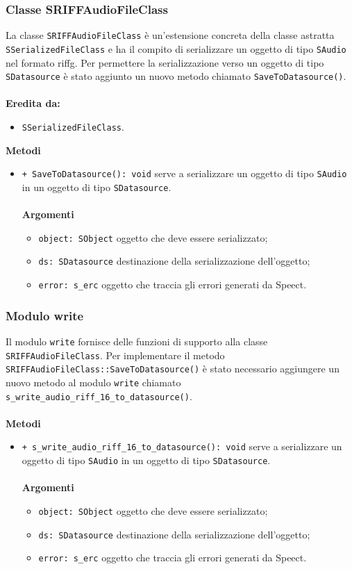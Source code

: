 \subsubsection{Classe SRIFFAudioFileClass}
La classe \texttt{SRIFFAudioFileClass} è un'estensione concreta della classe astratta \texttt{SSerializedFileClass} e ha il compito di serializzare un oggetto di tipo \texttt{SAudio} nel formato \gls{riffg}.
Per permettere la serializzazione verso un oggetto di tipo \texttt{SDatasource} è stato aggiunto un nuovo metodo chiamato \texttt{SaveToDatasource()}.\\\\
\textbf{Eredita da:}
\begin{itemize}
	\item \texttt{SSerializedFileClass}.
\end{itemize}
\textbf{Metodi}
\begin{itemize}
	\item \texttt{+ SaveToDatasource(): void} serve a serializzare un oggetto di tipo \texttt{SAudio} in un oggetto di tipo \texttt{SDatasource}.\\\\
	\textbf{Argomenti}
	\begin{itemize}
		\item \texttt{object: SObject} oggetto che deve essere serializzato;
		\item \texttt{ds: SDatasource} destinazione della serializzazione dell'oggetto;
		\item \texttt{error: s\_erc} oggetto che traccia gli errori generati da Speect.
	\end{itemize}
\end{itemize}

\subsubsection{Modulo write}
Il modulo \texttt{write} fornisce delle funzioni di supporto alla classe \texttt{SRIFFAudioFileClass}. Per implementare il metodo \texttt{SRIFFAudioFileClass::SaveToDatasource()} è stato necessario aggiungere un nuovo metodo al modulo \texttt{write} chiamato \texttt{s\_write\_audio\_riff\_16\_to\_datasource()}.\\\\
\textbf{Metodi}
\begin{itemize}
	\item \texttt{+ s\_write\_audio\_riff\_16\_to\_datasource(): void} serve a serializzare un oggetto di tipo \texttt{SAudio} in un oggetto di tipo \texttt{SDatasource}.\\\\
	\textbf{Argomenti}
	\begin{itemize}
		\item \texttt{object: SObject} oggetto che deve essere serializzato;
		\item \texttt{ds: SDatasource} destinazione della serializzazione dell'oggetto;
		\item \texttt{error: s\_erc} oggetto che traccia gli errori generati da Speect.
	\end{itemize}
\end{itemize}

